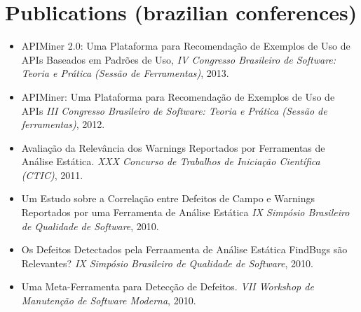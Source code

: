 \section*{Publications {\footnotesize (brazilian conferences)}}

\begin{itemize}
    \item APIMiner 2.0: Uma Plataforma para Recomendação de Exemplos de Uso de APIs Baseados em Padrões de Uso, \textit{IV Congresso Brasileiro de Software: Teoria e Prática (Sessão de Ferramentas)}, 2013. 
    \item APIMiner: Uma Plataforma para Recomendação de Exemplos de Uso de APIs \textit{III Congresso Brasileiro de Software: Teoria e Prática (Sessão de ferramentas)}, 2012.
    \item Avaliação da Relevância dos Warnings Reportados por Ferramentas de Análise Estática. \textit{XXX Concurso de Trabalhos de Iniciação Científica (CTIC)}, 2011.
    \item Um Estudo sobre a Correlação entre Defeitos de Campo e Warnings Reportados por uma Ferramenta de Análise Estática \textit{IX Simpósio Brasileiro de Qualidade de Software}, 2010.
    \item Os Defeitos Detectados pela Ferraamenta de Análise Estática FindBugs são Relevantes? \textit{IX Simpósio Brasileiro de Qualidade de Software}, 2010.
    \item Uma Meta-Ferramenta para Detecção de Defeitos. \textit{VII Workshop de Manutenção de Software Moderna}, 2010.
\end{itemize}